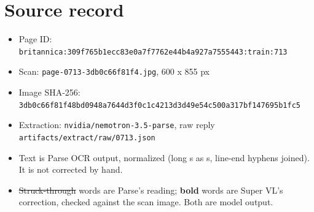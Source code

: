 \documentclass[10pt]{article}
\begin{document}
\section*{Source record}
\begin{itemize}
\item Page ID: \texttt{britannica:309f765b1ecc83e0a7f7762e44b4a927a7555443:train:713}
\item Scan: \texttt{page-0713-3db0c66f81f4.jpg}, 600 x 855 px
\item Image SHA-256: \texttt{\small 3db0c66f81f48bd0948a7644d3f0c1c4213d3d49e54c500a317bf147695b1fc5}
\item Extraction: \texttt{nvidia/nemotron-3.5-parse}, raw reply \texttt{artifacts/extract/raw/0713.json}
\item Text is Parse OCR output, normalized (long s as s, line-end hyphens joined). It is not corrected by hand.
\item \sout{Struck-through} words are Parse's reading; \textbf{bold} words are Super VL's correction, checked against the scan image. Both are model output.
\end{itemize}
\end{document}
